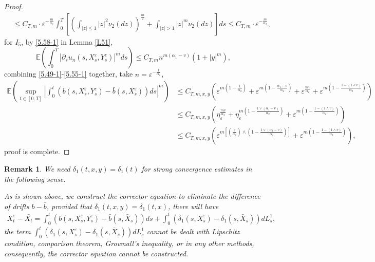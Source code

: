 \documentclass[11pt,reqno]{amsart}
\newtheorem{remark}{\indent Remark}[section]
\numberwithin{equation}{section}
\begin{document}
\begin{proof}
\begin{align}
&\leq C_{T,m}\cdot\varepsilon^{-\frac{m}{\alpha_{2}}}  \int_{0}^{T}\left[\left(\int_{|z|\leq 1}| z|^{2}\nu_{2}(dz) \right)^{\frac{m}{2}}+\int_{|z|> 1}|z|^{m}\nu_{2}(dz) \right]ds \leq C_{T,m}\cdot\varepsilon^{-\frac{m}{\alpha_{2}}} ,\label{5.54}
\end{align}
for $I_{5}$, by \eqref{5.58-1}  in Lemma \ref{L51},
\begin{equation}\label{5.55-1}
	\mathbb{E}\left(  \int_{0}^{T}\left|\partial_{s}u_{n}(s,X_{s}^{\varepsilon},Y_{s}^{\varepsilon})\right|^{m}ds
	\right)  \leq C_{T,m}n^{m(\alpha_{1}-v)}(1+|y|^{m}),
	\end{equation}
combining \eqref{5.49-1}-\eqref{5.55-1} together, take $n=\varepsilon^{-\frac{1}{\alpha_{2}}}$,
\begin{align*}
\mathbb{E}\left( \sup_{t\in [0,T]}\left| \int_{0}^{t}\left( b(s,X_{s}^{\varepsilon},Y_{s}^{\varepsilon})-\bar{b}(s,X_{s}^{\varepsilon})\right)ds\right|^{m} \right)
&\leq C_{T,m,x,y}\left( \varepsilon^{m(1-\frac{1}{\alpha_{2}})}+\varepsilon^{m(1-\frac{\alpha_{1}-v}{\alpha_{2}})}+\varepsilon^{\frac{mv}{\alpha_{2}}}+\varepsilon^{m(1-\frac{1-(1\wedge v)}{\alpha_{2}})} \right)\\ 
&\leq  C_{T,m,x,y}\left(\eta_{\varepsilon}^{\frac{mv}{\alpha_{2}}}+\eta_{\varepsilon}^{m(1-\frac{1\vee(\alpha_{1}-v)}{\alpha_{2}})}+\varepsilon^{m(1-\frac{1-(1\wedge v)}{\alpha_{2}})}\right)\\
&\leq  C_{T,m,x,y}\left(\varepsilon^{m\left[ \left( \frac{v}{\alpha_{2}}\right) \wedge \left( 1-\frac{1\vee(\alpha_{1}-v)}{\alpha_{2}}\right) \right] }+\varepsilon^{m(1-\frac{1-(1\wedge v)}{\alpha_{2}})}\right),
\end{align*}
proof is complete.
\end{proof}


\begin{remark}\label{d1}
We need $\delta_{1}(t,x,y)=\delta_{1}(t)$ for strong convergence estimates in the following sense. 
	
As is shown above, we construct the corrector equation to eliminate the difference of drifts $b-\bar{b}$, provided that $\delta_{1}(t,x,y)= \delta_{1}(t,x)$, there will have
\begin{align*}
	X_{t}^{\varepsilon}-\bar{X_{t}}=\int_{0}^{t}\left( b(s,X_{s}^{\varepsilon},Y_{s}^{\varepsilon})-\bar{b}(s,\bar{X}_{s})\right)ds+\int_{0}^{t}(\delta_{1}(s,X_{s}^{\varepsilon})-\delta_{1}(s,\bar{X}_{s}))dL_{s}^{1},
\end{align*}
the term $\int_{0}^{t}(\delta_{1}(s,X_{s}^{\varepsilon})-\delta_{1}(s,\bar{X}_{s}))dL_{s}^{1}$ cannot be dealt with Lipschitz condition, comparison theorem, Grownall’s inequality, or in any other methods,  consequently, the corrector equation cannot be constructed.
\end{remark}
\end{document}
